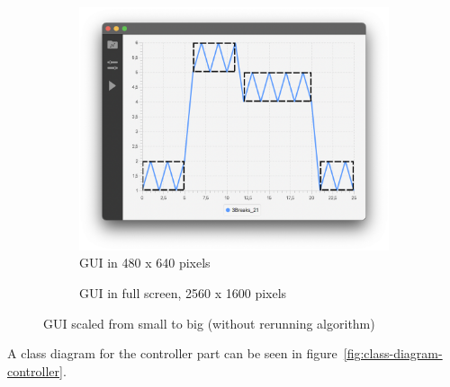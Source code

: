 \begin{figure}[ht]
    \centering
    \begin{subfigure}[b]{.48\textwidth}
        \centering
        \includegraphics[width=\textwidth]{fig/gui-small-screen.png}
        \caption{GUI in 480 x 640 pixels}
        \label{fig:gui-small-screen}
    \end{subfigure}
    \hfill
    \begin{subfigure}[b]{.48\textwidth}
        \centering
        \caption{GUI in full screen, 2560 x 1600 pixels}
        \label{fig:gui-full-screen}
    \end{subfigure}
    \caption{GUI scaled from small to big (without rerunning algorithm)}
    \label{fig:gui-scaling}
\end{figure}

A class diagram for the controller part can be seen in
figure~\ref{fig:class-diagram-controller}. 



